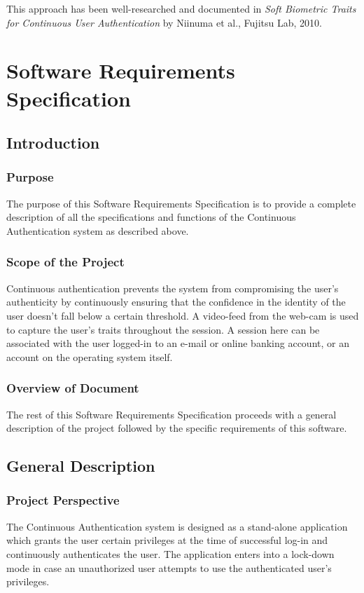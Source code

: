 \documentclass[12pt]{article}			%
\begin{document}
This approach has been well-researched and documented in \textit{Soft Biometric Traits for Continuous User Authentication} by Niinuma et al., Fujitsu Lab, 2010.

\section{Software Requirements Specification }
\subsection{ Introduction }

\subsubsection{ Purpose }
The purpose of this Software Requirements Specification is to provide a complete description of all the specifications and functions of the Continuous Authentication system as described above.

\subsubsection{ Scope of the Project }
Continuous authentication prevents the system from compromising the user's authenticity by continuously ensuring that the confidence in the identity of the user doesn't fall below a certain threshold. A video-feed from the web-cam is used to capture the user's traits throughout the session. A session here can be associated with the user logged-in to an e-mail or online banking account, or an account on the operating system itself.

\subsubsection{ Overview of Document }
The rest of this Software Requirements Specification proceeds with a general description of the project followed by the specific requirements of this software. 

\subsection{ General Description }
\subsubsection{ Project Perspective }
The Continuous Authentication system is designed as a stand-alone application which grants the user certain privileges at the time of successful log-in and continuously authenticates the user. The application enters into a lock-down mode in case an unauthorized  user attempts to use the authenticated user's privileges. 
\end{document}
